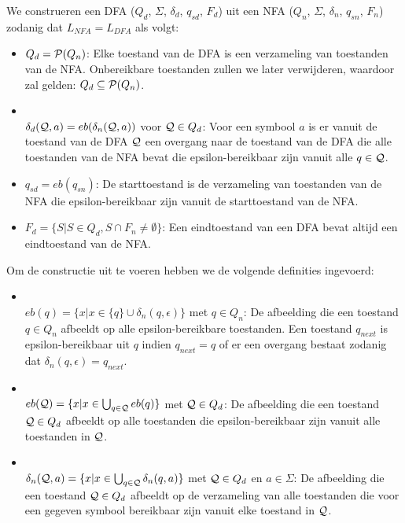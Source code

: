   We construeren een DFA ($Q_d$, $\Sigma$, $\delta_d$, $q_{sd}$, $F_d$) uit een NFA ($Q_n$, $\Sigma$, $\delta_n$, $q_{sn}$, $F_n$) zodanig dat $L_{NFA} = L_{DFA}$ als volgt:
  \begin{itemize}
  \item $Q_d = \mathcal{P}(Q_n)$: Elke toestand van de DFA is een verzameling van toestanden van de NFA. Onbereikbare toestanden zullen we later verwijderen, waardoor zal gelden: $Q_d \subseteq \mathcal{P}(Q_n)$.
  \item {}\\$\delta_d(\mathcal{Q}, a) = eb(\delta_n(\mathcal{Q}, a))$ voor $\mathcal{Q} \in Q_d$: Voor een symbool $a$ is er vanuit de toestand van de DFA $\mathcal{Q}$ een overgang naar de toestand van de DFA die alle toestanden van de NFA bevat die epsilon-bereikbaar zijn vanuit alle $q \in \mathcal{Q}$.
  \item $q_{sd} = eb(q_{sn})$: De starttoestand is de verzameling van toestanden van de NFA die epsilon-bereikbaar zijn vanuit de starttoestand van de NFA.
  \item $F_d = \{S|S \in Q_d, S \cap F_n \neq \emptyset\}$: Een eindtoestand van een DFA bevat altijd een eindtoestand van de NFA.
  \end{itemize}
  Om de constructie uit te voeren hebben we de volgende definities ingevoerd:
  \begin{itemize}
  \item {}\\ $eb(q) = \{x|x \in \{q\} \cup \delta_n(q, \epsilon)\}$ met $q \in Q_n$: De afbeelding die een toestand $q \in Q_n$ afbeeldt op alle epsilon-bereikbare toestanden. Een toestand $q_{next}$ is epsilon-bereikbaar uit $q$ indien $q_{next} = q$ of er een overgang bestaat zodanig dat $\delta_n(q, \epsilon) = q_{next}$.
  \item {}\\ $eb(\mathcal{Q}) = \{x|x \in \bigcup_{q \in \mathcal{Q}}eb(q)\}$ met $\mathcal{Q} \in Q_d$: De afbeelding die een toestand $\mathcal{Q} \in Q_d$ afbeeldt op alle toestanden die epsilon-bereikbaar zijn vanuit alle toestanden in $\mathcal{Q}$.
  \item {}\\ $\delta_n(\mathcal{Q}, a) = \{x|x \in \bigcup_{q \in \mathcal{Q}}\delta_n(q, a)\}$ met $\mathcal{Q} \in Q_d$ en $a \in \Sigma$: De afbeelding die een toestand $\mathcal{Q} \in Q_d$ afbeeldt op de verzameling van alle toestanden die voor een gegeven symbool bereikbaar zijn vanuit elke toestand in $\mathcal{Q}$.
  \end{itemize}